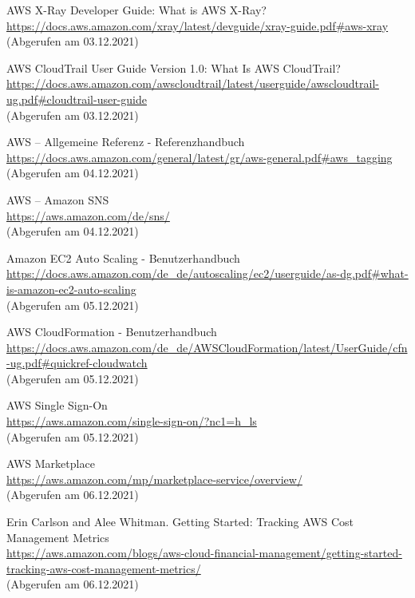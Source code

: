 \begin{thebibliography}{HR08}
  AWS X-Ray Developer Guide: What is AWS X-Ray? \\
  \url{https://docs.aws.amazon.com/xray/latest/devguide/xray-guide.pdf#aws-xray}\\
  (Abgerufen am 03.12.2021) 
  
 AWS CloudTrail User Guide Version 1.0: What Is AWS CloudTrail?\\
  \url{https://docs.aws.amazon.com/awscloudtrail/latest/userguide/awscloudtrail-ug.pdf#cloudtrail-user-guide}\\
  (Abgerufen am 03.12.2021)

 AWS – Allgemeine Referenz - Referenzhandbuch\\
  \url{https://docs.aws.amazon.com/general/latest/gr/aws-general.pdf#aws_tagging}\\
  (Abgerufen am 04.12.2021)
  
   AWS – Amazon SNS\\
  \url{https://aws.amazon.com/de/sns/}\\
  (Abgerufen am 04.12.2021)

   Amazon EC2 Auto Scaling - Benutzerhandbuch \\
  \url{https://docs.aws.amazon.com/de_de/autoscaling/ec2/userguide/as-dg.pdf#what-is-amazon-ec2-auto-scaling}\\
  (Abgerufen am 05.12.2021)

     AWS CloudFormation - Benutzerhandbuch\\
  \url{https://docs.aws.amazon.com/de_de/AWSCloudFormation/latest/UserGuide/cfn-ug.pdf#quickref-cloudwatch}\\
  (Abgerufen am 05.12.2021)
  
   AWS Single Sign-On\\
  \url{https://aws.amazon.com/single-sign-on/?nc1=h_ls}\\
  (Abgerufen am 05.12.2021)
   
   AWS Marketplace\\
  \url{https://aws.amazon.com/mp/marketplace-service/overview/}\\
  (Abgerufen am 06.12.2021)
  
 Erin Carlson and Alee Whitman. Getting Started: Tracking AWS Cost Management Metrics\\
  \url{https://aws.amazon.com/blogs/aws-cloud-financial-management/getting-started-tracking-aws-cost-management-metrics/}\\
  (Abgerufen am 06.12.2021)
  

\end{thebibliography}
